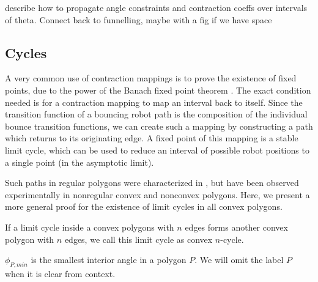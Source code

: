 \documentclass[]{svproc}  %
\begin{document}
{\color{red} describe how to propagate angle constraints and contraction coeffs
over intervals of theta. Connect back to funnelling, maybe with a fig if we
have space}


\subsection{Cycles}

A very common use of contraction mappings is to prove the existence of fixed
points, due to the power of the Banach fixed point theorem \cite{Granas2003}.
The exact condition needed is for a contraction mapping to map an interval back
to itself. Since the transition function of a bouncing robot path is the
composition of the individual bounce transition functions, we can create such a
mapping by constructing a path which returns to its originating edge. A fixed
point of this mapping is a stable limit cycle, which can be used to reduce an
interval of possible robot positions to a single point (in the asymptotic
limit).

Such paths
in regular polygons were characterized in \cite{NilBecLav17}, but have been
observed experimentally in nonregular convex and nonconvex polygons. Here, we
present a more general proof for the existence of limit cycles in all convex
polygons.

\begin{definition}
If a limit cycle inside a convex polygons with $n$ edges forms another convex
polygon with $n$ edges, we call this limit cycle as convex $n$-cycle.
\end{definition}

\begin{definition}
$\phi_{P,min}$ is the smallest interior angle in a polygon $P$. We will omit the
label $P$ when it is clear from context.
\end{definition}
\end{document}

